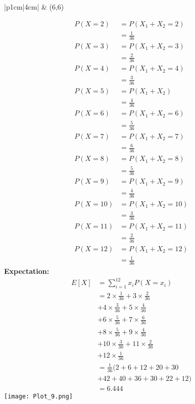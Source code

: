 \documentclass{article}
\begin{document}
\begin{multicols}{2}
\begin{center}
\begin{tabular}{|p{1cm}|{4cm}|}
         & (6,6)  \\
        \hline
    \end{tabular}
\end{center}
\begin{align}
    P(X=2)&=P(X_1+X_2=2) \nonumber \\
          &=\frac{1}{36} \nonumber \\
    P(X=3)&=P(X_1+X_2=3) \nonumber \\
          &=\frac{2}{36} \nonumber \\
    P(X=4) &=P(X_1+X_2=4) \nonumber \\
           &=\frac{3}{36} \nonumber \\
    P(X=5) &= P(X_1+X_2) \nonumber \\
           &=\frac{4}{36} \nonumber \\
    P(X=6) &=P(X_1+X_2=6) \nonumber \\
           &=\frac{5}{36} \nonumber \\
    P(X=7) &=P(X_1+X_2=7) \nonumber \\
           &=\frac{6}{36} \nonumber \\
    P(X=8) &=P(X_1+X_2=8) \nonumber \\
           &=\frac{5}{36} \nonumber \\
    P(X=9) &=P(X_1+X_2=9) \nonumber \\
           &=\frac{4}{36} \nonumber \\
    P(X=10)&=P(X_1+X_2=10) \nonumber \\
           &=\frac{3}{36} \nonumber \\
    P(X=11) &=P(X_1+X_2=11) \nonumber \\
           &=\frac{2}{36}  \nonumber \\
    P(X=12) &=P(X_1+X_2=12) \nonumber \\
           &=\frac{1}{36} \nonumber 
\end{align}
\textbf{Expectation:}
\begin{align}
    E[X]&=\sum_{i=1}^{12}x_iP(X=x_i) \nonumber \\
        &=2\times \frac{1}{36}+3\times \frac{2}{36} \nonumber \\
        &+4\times \frac{3}{36}+5\times \frac{4}{36} \nonumber \\
        &+6\times \frac{5}{36}+7\times \frac{6}{36} \nonumber \\
        &+8\times \frac{5}{36}+9\times \frac{4}{36} \nonumber \\
        &+10\times \frac{3}{36}+11\times \frac{2}{36} \nonumber \\
        &+12\times \frac{1}{36} \nonumber \\
        &=\frac{1}{36}(2+6+12+20+30 \nonumber \\
        &+42+40+36+30+22+12)    \nonumber \\
        &=6.444 \nonumber
\end{align}
\texttt{[image: Plot\_9.png]}



\end{multicols}
\end{document}
